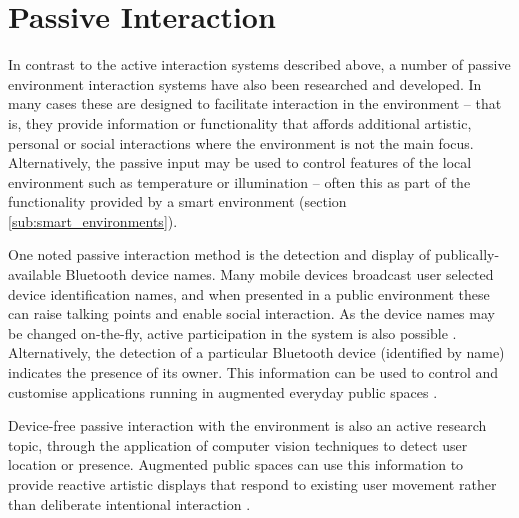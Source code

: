 \documentclass[oribibl,11pt]{llncs}
\begin{document}


\section{Passive Interaction}	\label{sec:passive_interaction}

In contrast to the active interaction systems described above, a number of passive environment interaction systems have also been researched and developed. In many cases these are designed to facilitate interaction in the environment -- that is, they provide information or functionality that affords additional artistic, personal or social interactions where the environment is not the main focus. Alternatively, the passive input may be used to control features of the local environment such as temperature or illumination -- often this as part of the functionality provided by a smart environment (section \ref{sub:smart_environments}).


One noted passive interaction method is the detection and display of publically-available Bluetooth device names. Many mobile devices broadcast user selected device identification names, and when presented in a public environment these can raise talking points and enable social interaction. As the device names may be changed on-the-fly, active participation in the system is also possible \cite{palmer2010bluetooth}. Alternatively, the detection of a particular Bluetooth device (identified by name) indicates the presence of its owner. This information can be used to control and customise applications running in augmented everyday public spaces \cite{Davies:2009:UBD:1555816.1555832}.

Device-free passive interaction with the environment is also an active research topic, through the application of computer vision techniques to detect user location or presence. Augmented public spaces can use this information to provide reactive artistic displays that respond to existing user movement rather than deliberate intentional interaction \cite{Nguyen:2006:MSV:1180639.1180732}.


\end{document}
